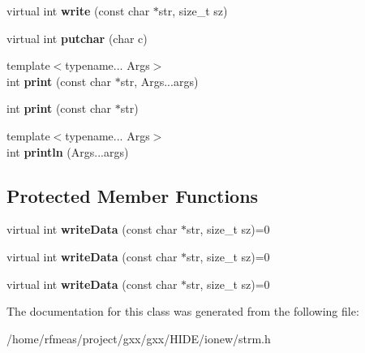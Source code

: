 \begin{DoxyCompactItemize}
\item 
virtual int {\bfseries write} (const char $\ast$str, size\+\_\+t sz)\hypertarget{classgxx_1_1io_1_1strmout_abb1fc1d2780138a4d176ef25b1742b0d}{}\label{classgxx_1_1io_1_1strmout_abb1fc1d2780138a4d176ef25b1742b0d}

\item 
virtual int {\bfseries putchar} (char c)\hypertarget{classgxx_1_1io_1_1strmout_ac933aaaa835edf900a35d2affaeede7c}{}\label{classgxx_1_1io_1_1strmout_ac933aaaa835edf900a35d2affaeede7c}

\item 
{\footnotesize template$<$typename... Args$>$ }\\int {\bfseries print} (const char $\ast$str, Args...\+args)\hypertarget{classgxx_1_1io_1_1strmout_a6442000afc421a0dd64425cd4915b65b}{}\label{classgxx_1_1io_1_1strmout_a6442000afc421a0dd64425cd4915b65b}

\item 
int {\bfseries print} (const char $\ast$str)\hypertarget{classgxx_1_1io_1_1strmout_a2a57b1ead8397800021d17250b5022ca}{}\label{classgxx_1_1io_1_1strmout_a2a57b1ead8397800021d17250b5022ca}

\item 
{\footnotesize template$<$typename... Args$>$ }\\int {\bfseries println} (Args...\+args)\hypertarget{classgxx_1_1io_1_1strmout_a14338a75a3d625b1b548f03d93b0f5dd}{}\label{classgxx_1_1io_1_1strmout_a14338a75a3d625b1b548f03d93b0f5dd}

\end{DoxyCompactItemize}
\subsection*{Protected Member Functions}
\begin{DoxyCompactItemize}
\item 
virtual int {\bfseries write\+Data} (const char $\ast$str, size\+\_\+t sz)=0\hypertarget{classgxx_1_1io_1_1strmout_a617d2f076acf58fe33593dbc7614830e}{}\label{classgxx_1_1io_1_1strmout_a617d2f076acf58fe33593dbc7614830e}

\item 
virtual int {\bfseries write\+Data} (const char $\ast$str, size\+\_\+t sz)=0\hypertarget{classgxx_1_1io_1_1strmout_a617d2f076acf58fe33593dbc7614830e}{}\label{classgxx_1_1io_1_1strmout_a617d2f076acf58fe33593dbc7614830e}

\item 
virtual int {\bfseries write\+Data} (const char $\ast$str, size\+\_\+t sz)=0\hypertarget{classgxx_1_1io_1_1strmout_a617d2f076acf58fe33593dbc7614830e}{}\label{classgxx_1_1io_1_1strmout_a617d2f076acf58fe33593dbc7614830e}

\end{DoxyCompactItemize}


The documentation for this class was generated from the following file\+:\begin{DoxyCompactItemize}
\item 
/home/rfmeas/project/gxx/gxx/\+H\+I\+D\+E/ionew/strm.\+h\end{DoxyCompactItemize}
